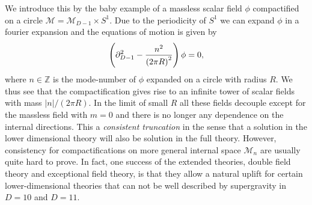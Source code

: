 We introduce this by the baby example of a massless scalar field $\phi$ compactified on a circle $\mathcal{M}=\mathcal{M}_{D-1}\times S^1$. Due to the periodicity of $S^1$ we can expand $\phi$ in a fourier expansion and the equations of motion is given by 
\begin{equation}
    \left(\partial^2_{D-1}-\frac{n^2}{\left(2\pi R\right)^2}\right)\phi = 0,
\end{equation}
where $n\in\mathbb{Z}$ is the mode-number of $\phi$ expanded on a circle with radius $R$. We thus see that the compactification gives rise to an infinite tower of scalar fields with mass $|n|/(2\pi R)$. In the limit of small $R$ all these fields decouple except for the massless field with $m=0$ and there is no longer any dependence on the internal directions. This a \emph{consistent truncation} in the sense that a solution in the lower dimensional theory will also be solution in the full theory. However, consistency for compactifications on more general internal space $\mathcal{M}_n$ are usually quite hard to prove. In fact, one success of the extended theories, double field theory and exceptional field theory, is that they allow a natural uplift for certain lower-dimensional theories that can not be well described by supergravity in $D=10$ and $D=11$. 

